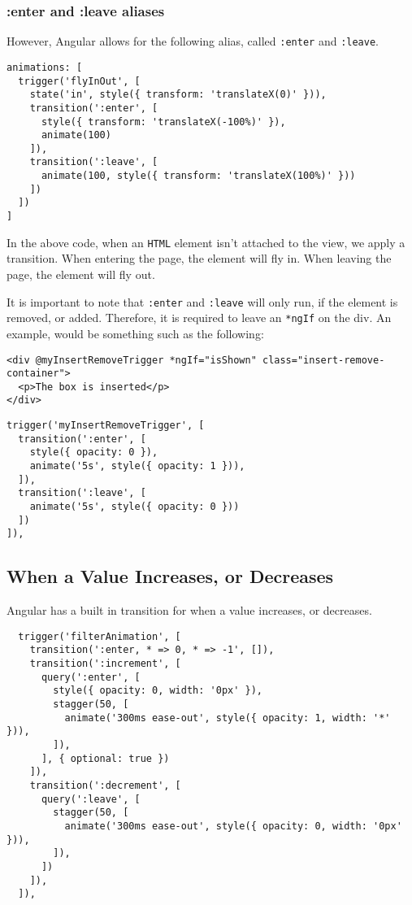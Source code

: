\subsubsection{ :enter and :leave aliases }

However, Angular allows for the following alias, called \lstinline{:enter} and
\lstinline{:leave}. 

\begin{lstlisting}
animations: [
  trigger('flyInOut', [
    state('in', style({ transform: 'translateX(0)' })),
    transition(':enter', [
      style({ transform: 'translateX(-100%)' }),
      animate(100)
    ]),
    transition(':leave', [
      animate(100, style({ transform: 'translateX(100%)' }))
    ])
  ])
]
\end{lstlisting}

In the above code, when an \lstinline{HTML} element isn't attached to the view, 
we apply a transition. When entering the page, the element will fly in. When 
leaving the page, the element will fly out. 

It is important to note that \lstinline{:enter} and \lstinline{:leave} will
only run, if the element is removed, or added. Therefore, it is required to 
leave an \lstinline{*ngIf} on the div. An example, would be something such as
the following: 
\begin{lstlisting}[caption=insert-remove.component.html]
<div @myInsertRemoveTrigger *ngIf="isShown" class="insert-remove-container">
  <p>The box is inserted</p>
</div>  
\end{lstlisting}

\begin{lstlisting}[caption=insert-remove.component.ts]
trigger('myInsertRemoveTrigger', [
  transition(':enter', [
    style({ opacity: 0 }),
    animate('5s', style({ opacity: 1 })),
  ]),
  transition(':leave', [
    animate('5s', style({ opacity: 0 }))
  ])
]),  
\end{lstlisting}


\subsection{When a Value Increases, or Decreases}
Angular has a built in transition for when a value increases, or decreases. 
\begin{lstlisting}
  trigger('filterAnimation', [
    transition(':enter, * => 0, * => -1', []),
    transition(':increment', [
      query(':enter', [
        style({ opacity: 0, width: '0px' }),
        stagger(50, [
          animate('300ms ease-out', style({ opacity: 1, width: '*' })),
        ]),
      ], { optional: true })
    ]),
    transition(':decrement', [
      query(':leave', [
        stagger(50, [
          animate('300ms ease-out', style({ opacity: 0, width: '0px' })),
        ]),
      ])
    ]),
  ]),  
\end{lstlisting}


